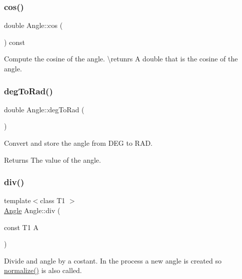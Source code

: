 \subsubsection{\texorpdfstring{cos()}{cos()}}
{\footnotesize\ttfamily double Angle\+::cos (\begin{DoxyParamCaption}{ }\end{DoxyParamCaption}) const\hspace{0.3cm}{\ttfamily [inline]}}



Compute the cosine of the angle. \textbackslash{}retunrs A {\ttfamily double} that is the cosine of the angle. 

\mbox{\label{class_angle_a0db2d1c054e899c7f5d27091a82dec4a}} 
\subsubsection{\texorpdfstring{degToRad()}{degToRad()}}
{\footnotesize\ttfamily double Angle\+::deg\+To\+Rad (\begin{DoxyParamCaption}{ }\end{DoxyParamCaption})\hspace{0.3cm}{\ttfamily [inline]}}



Convert and store the angle from D\+EG to R\+AD. 

\begin{DoxyReturn}{Returns}
The value of the angle. 
\end{DoxyReturn}
\mbox{\label{class_angle_accc4f9c0df6965dc1fecab234d30b348}} 
\subsubsection{\texorpdfstring{div()}{div()}}
{\footnotesize\ttfamily template$<$class T1 $>$ \\
\mbox{\hyperlink{class_angle}{Angle}} Angle\+::div (\begin{DoxyParamCaption}\item[{const T1}]{A }\end{DoxyParamCaption})\hspace{0.3cm}{\ttfamily [inline]}}



Divide and angle by a costant. In the process a new angle is created so {\ttfamily \mbox{\hyperlink{class_angle_a449fc0638ca2e26b4a57d1cce95788e8}{normalize()}}} is also called. 


